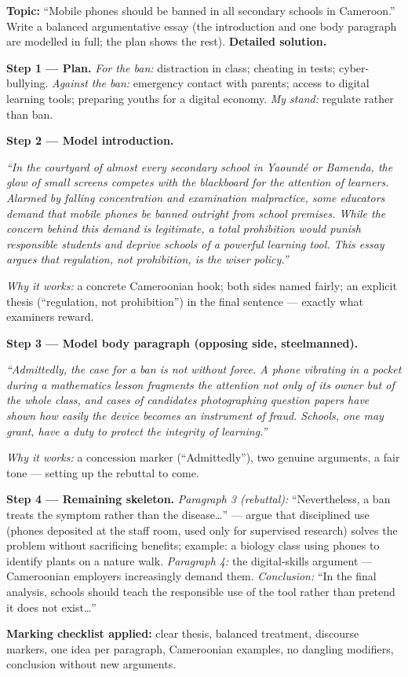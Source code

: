 \documentclass[11pt]{article}
\begin{document}
\begin{exoresolu}
\textbf{Topic:} ``Mobile phones should be banned in all secondary schools in Cameroon.'' Write a balanced argumentative essay (the introduction and one body paragraph are modelled in full; the plan shows the rest).
\tcblower
\textbf{Detailed solution.}

\textbf{Step 1 — Plan.} \emph{For the ban:} distraction in class; cheating in tests; cyber-bullying. \emph{Against the ban:} emergency contact with parents; access to digital learning tools; preparing youths for a digital economy. \emph{My stand:} regulate rather than ban.

\textbf{Step 2 — Model introduction.}

\emph{``In the courtyard of almost every secondary school in Yaound\'e or Bamenda, the glow of small screens competes with the blackboard for the attention of learners. Alarmed by falling concentration and examination malpractice, some educators demand that mobile phones be banned outright from school premises. While the concern behind this demand is legitimate, a total prohibition would punish responsible students and deprive schools of a powerful learning tool. This essay argues that regulation, not prohibition, is the wiser policy.''}

\emph{Why it works:} a concrete Cameroonian hook; both sides named fairly; an explicit thesis (``regulation, not prohibition'') in the final sentence — exactly what examiners reward.

\textbf{Step 3 — Model body paragraph (opposing side, steelmanned).}

\emph{``Admittedly, the case for a ban is not without force. A phone vibrating in a pocket during a mathematics lesson fragments the attention not only of its owner but of the whole class, and cases of candidates photographing question papers have shown how easily the device becomes an instrument of fraud. Schools, one may grant, have a duty to protect the integrity of learning.''}

\emph{Why it works:} a concession marker (``Admittedly''), two genuine arguments, a fair tone — setting up the rebuttal to come.

\textbf{Step 4 — Remaining skeleton.} \emph{Paragraph 3 (rebuttal):} ``Nevertheless, a ban treats the symptom rather than the disease\ldots'' — argue that disciplined use (phones deposited at the staff room, used only for supervised research) solves the problem without sacrificing benefits; example: a biology class using phones to identify plants on a nature walk. \emph{Paragraph 4:} the digital-skills argument — Cameroonian employers increasingly demand them. \emph{Conclusion:} ``In the final analysis, schools should teach the responsible use of the tool rather than pretend it does not exist\ldots''

\textbf{Marking checklist applied:} clear thesis, balanced treatment, discourse markers, one idea per paragraph, Cameroonian examples, no dangling modifiers, conclusion without new arguments.
\end{exoresolu}
\end{document}
